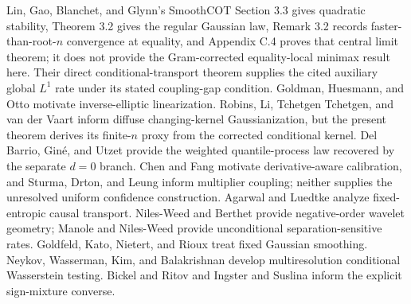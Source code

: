 Lin, Gao, Blanchet, and Glynn's SmoothCOT Section 3.3 gives quadratic stability, Theorem 3.2 gives the regular Gaussian law, Remark 3.2 records faster-than-root-\(n\) convergence at equality, and Appendix C.4 proves that central limit theorem; it does not provide the Gram-corrected equality-local minimax result here.  Their direct conditional-transport theorem supplies the cited auxiliary global \(L^1\) rate under its stated coupling-gap condition.  Goldman, Huesmann, and Otto motivate inverse-elliptic linearization.  Robins, Li, Tchetgen Tchetgen, and van der Vaart inform diffuse changing-kernel Gaussianization, but the present theorem derives its finite-\(n\) proxy from the corrected conditional kernel.  Del Barrio, Gin\'e, and Utzet provide the weighted quantile-process law recovered by the separate \(d=0\) branch.  Chen and Fang motivate derivative-aware calibration, and Sturma, Drton, and Leung inform multiplier coupling; neither supplies the unresolved uniform confidence construction.  Agarwal and Luedtke analyze fixed-entropic causal transport.  Niles-Weed and Berthet provide negative-order wavelet geometry; Manole and Niles-Weed provide unconditional separation-sensitive rates.  Goldfeld, Kato, Nietert, and Rioux treat fixed Gaussian smoothing.  Neykov, Wasserman, Kim, and Balakrishnan develop multiresolution conditional Wasserstein testing.  Bickel and Ritov and Ingster and Suslina inform the explicit sign-mixture converse.